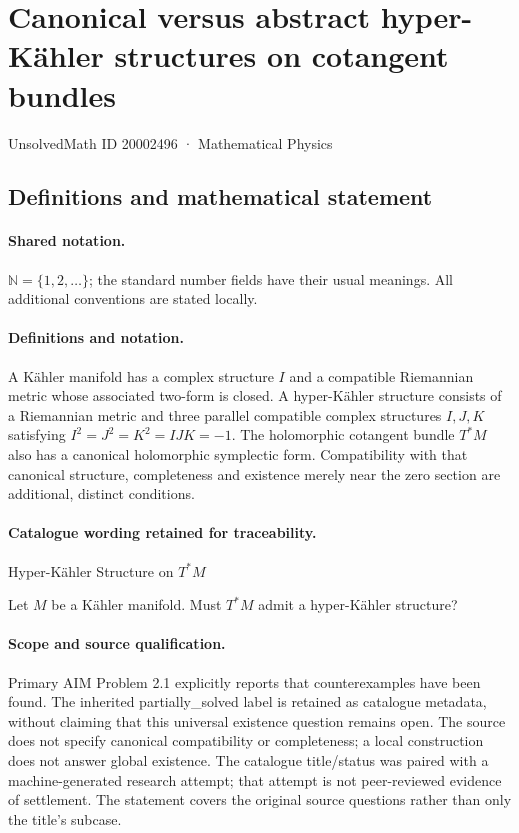 \documentclass[11pt]{article}
\begin{document}
\setcounter{section}{20002495}
\section{Canonical versus abstract hyper-Kähler structures on cotangent bundles}\label{20002496}
{\small UnsolvedMath ID 20002496 · Mathematical Physics}
\subsection{Definitions and mathematical statement}

\paragraph{Shared notation.}$\mathbb N=\{1,2,\ldots\}$; the standard number fields have their usual meanings. All additional conventions are stated locally.


\paragraph{Definitions and notation.}A Kähler manifold has a complex structure $I$ and a compatible Riemannian metric whose associated two-form is closed. A hyper-Kähler structure consists of a Riemannian metric and three parallel compatible complex structures $I,J,K$ satisfying $I^2=J^2=K^2=IJK=-1$. The holomorphic cotangent bundle $T^*M$ also has a canonical holomorphic symplectic form. Compatibility with that canonical structure, completeness and existence merely near the zero section are additional, distinct conditions.

\paragraph{Catalogue wording retained for traceability.}
Hyper-K\"{a}hler Structure on $T^* M$

Let $M$ be a K\"{a}hler manifold. Must $T^*M$ admit a hyper-K\"{a}hler structure?
\paragraph{Scope and source qualification.}Primary AIM Problem 2.1 explicitly reports that counterexamples have been found. The inherited partially_solved label is retained as catalogue metadata, without claiming that this universal existence question remains open. The source does not specify canonical compatibility or completeness; a local construction does not answer global existence. The catalogue title/status was paired with a machine-generated research attempt; that attempt is not peer-reviewed evidence of settlement. The statement covers the original source questions rather than only the title’s subcase.
\end{document}
